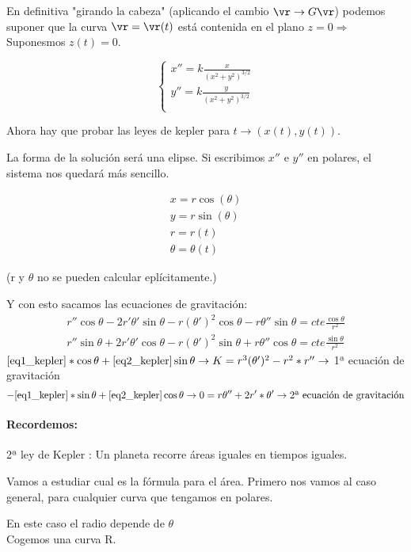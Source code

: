 En definitiva "girando la cabeza" (aplicando el cambio $\vr \rightarrow G\vr$) podemos suponer que la curva $\vr = \vr(t)$ está contenida en el plano $z = 0 \Rightarrow$ Suponesmos $z(t) = 0$.


$$
\begin{cases}
 x'' = k\frac{x}{(x^2 + y^2)^{3/2}}\\
 y'' = k\frac{y}{(x^2 + y^2)^{3/2}}\\
\end{cases}
$$

Ahora hay que probar las leyes de kepler para $t \rightarrow (x(t), y(t))$.

La forma de la solución será una elipse.
Si escribimos $x''$ e $y''$ en polares, el sistema nos quedará más sencillo.

$$\begin{array}{c}
x = r\cos(\theta)\\
y = r\sin(\theta) \\
r = r(t) \\
\theta = \theta(t)
\end{array}
$$

(r y $\theta$ no se pueden calcular eplícitamente.)

Y con esto sacamos las ecuaciones de gravitación:
\begin{gather}
r''\cos\theta - 2r'\theta'\sin\theta - r(\theta')^2\cos\theta - r\theta''\sin\theta = cte \frac{\cos\theta}{r^2} \label{eq1_kepler}\\
r''\sin\theta + 2r'\theta'\cos\theta - r(\theta')^2\sin\theta + r\theta''\cos\theta = cte \frac{\sin\theta}{r^2} \label{eq2_kepler}
\end{gather}
$\eqref{eq1_kepler}*\cos\theta + \eqref{eq2_kepler}\sin\theta \rightarrow K= r^3(\theta')^2 - r^2*r'' \rightarrow$ 1ª ecuación de gravitación
$$-\eqref{eq1_kepler}*\sin\theta + \eqref{eq2_kepler}\cos\theta \rightarrow 0= r \theta'' + 2r' * \theta' \rightarrow \text{2ª ecuación de gravitación}$$


\paragraph{Recordemos:}
2ª ley de Kepler : Un planeta recorre áreas iguales en tiempos iguales.

Vamos a estudiar cual es la fórmula para el área.
Primero nos vamos al caso general, para cualquier curva que tengamos en polares.

En este caso el radio depende de $\theta$ \\
Cogemos una curva R.\\ 

